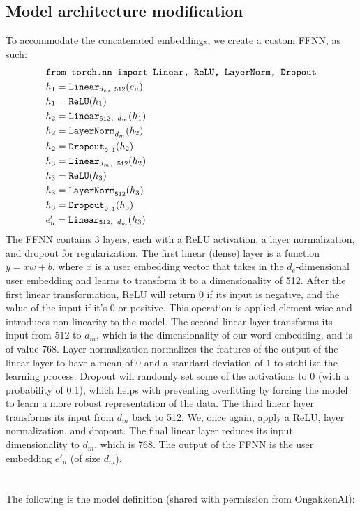 \documentclass{article}
\begin{document}
\subsection{Model architecture modification}
To accommodate the concatenated embeddings, we create a custom FFNN, as such:
\begin{equation}
	\begin{aligned}
	&\text{\texttt{from torch.nn import Linear, ReLU, LayerNorm, Dropout}} \\
	&h_{1} = \text{\texttt{Linear}}_{\text{\texttt{$d_e$, 512}}}(e_u) \\
	&h_{1} = \text{\texttt{ReLU}}(h_{1}) \\
	&h_{2} = \text{\texttt{Linear}}_{\text{\texttt{512, $d_m$}}}(h_{1}) \\
	&h_{2} = \text{\texttt{LayerNorm}}_{\text{\texttt{$d_m$}}}(h_{2}) \\
	&h_{2} = \text{\texttt{Dropout}}_{\text{\texttt{0.1}}}(h_{2}) \\
	&h_{3} = \text{\texttt{Linear}}_{\text{\texttt{$d_m$, 512}}}(h_{2}) \\
	&h_{3} = \text{\texttt{ReLU}}(h_{3}) \\
	&h_{3} = \text{\texttt{LayerNorm}}_{\text{\texttt{512}}}(h_{3}) \\
	&h_{3} = \text{\texttt{Dropout}}_{\text{\texttt{0.1}}}(h_{3}) \\
	&e'_u = \text{\texttt{Linear}}_{\text{\texttt{512, $d_m$}}}(h_{3}) \\
	\end{aligned}
\end{equation}
The FFNN contains 3 layers, each with a ReLU activation, a layer normalization, and dropout for regularization.
The first linear (dense) layer is a function $y = xw + b$, where $x$ is a user embedding vector that takes in the $d_e$-dimensional user embedding and learns to transform it to a dimensionality of 512.
After the first linear transformation, ReLU will return 0 if its input is negative, and the value of the input if it's 0 or positive. This operation is applied element-wise and introduces non-linearity to the model.
The second linear layer transforms its input from 512 to $d_m$, which is the dimensionality of our word embedding, and is of value 768.
Layer normalization normalizes the features of the output of the linear layer to have a mean of 0 and a standard deviation of 1 to stabilize the learning process.
Dropout will randomly set some of the activations to 0 (with a probability of 0.1), which helps with preventing overfitting by forcing the model to learn a more robust representation of the data.
The third linear layer transforms its input from $d_m$ back to 512. We, once again, apply a ReLU, layer normalization, and dropout.
The final linear layer reduces its input dimensionality to $d_m$, which is 768. The output of the FFNN is the user embedding $e'_u$ (of size $d_m$).\\
\\
\\
The following is the model definition (shared with permission from OngakkenAI):\\
	
\end{document}
